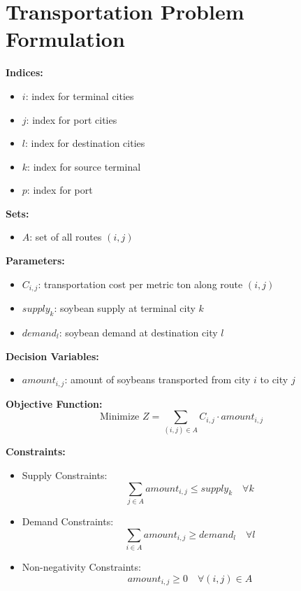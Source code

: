 \documentclass{article}
\begin{document}
\section*{Transportation Problem Formulation}

\textbf{Indices:}
\begin{itemize}
    \item $i$: index for terminal cities
    \item $j$: index for port cities
    \item $l$: index for destination cities
    \item $k$: index for source terminal
    \item $p$: index for port
\end{itemize}

\textbf{Sets:}
\begin{itemize}
    \item $A$: set of all routes $(i, j)$
\end{itemize}

\textbf{Parameters:}
\begin{itemize}
    \item $C_{i,j}$: transportation cost per metric ton along route $(i, j)$
    \item $supply_k$: soybean supply at terminal city $k$
    \item $demand_l$: soybean demand at destination city $l$
\end{itemize}

\textbf{Decision Variables:}
\begin{itemize}
    \item $amount_{i,j}$: amount of soybeans transported from city $i$ to city $j$
\end{itemize}

\textbf{Objective Function:}
\begin{equation}
\text{Minimize } Z = \sum_{(i,j) \in A} C_{i,j} \cdot amount_{i,j}
\end{equation}

\textbf{Constraints:}
\begin{itemize}
    \item Supply Constraints:
    \begin{equation}
    \sum_{j \in A} amount_{i,j} \leq supply_k \quad \forall k
    \end{equation}
    
    \item Demand Constraints:
    \begin{equation}
    \sum_{i \in A} amount_{i,j} \geq demand_l \quad \forall l
    \end{equation}
    
    \item Non-negativity Constraints:
    \begin{equation}
    amount_{i,j} \geq 0 \quad \forall (i,j) \in A
    \end{equation}
\end{itemize}
\end{document}

